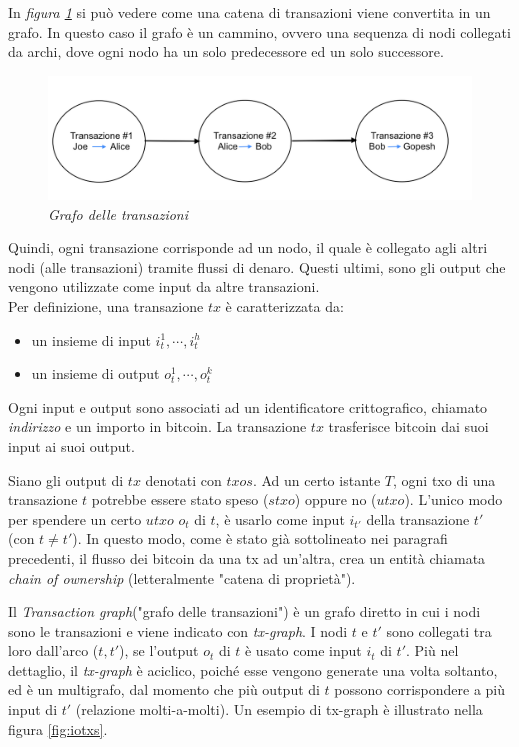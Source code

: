 In \textit{figura \ref{fig:threenodes}} si può vedere come una catena di transazioni viene convertita in un grafo. In questo caso il grafo è un cammino, ovvero una sequenza di nodi collegati da archi, dove ogni nodo ha un solo predecessore ed un solo successore.

\begin{figure}[htbp]
	\centering
	\includegraphics[width=\linewidth]{figure/threenodes}
	\caption{\textit{Grafo delle transazioni} \label{fig:threenodes}}
\end{figure}

Quindi, ogni transazione corrisponde ad un nodo, il quale è collegato agli altri nodi (alle transazioni) tramite flussi di denaro. Questi ultimi, sono gli output che vengono utilizzate come input da altre transazioni.
\\

Per definizione, una transazione $tx$ è caratterizzata da:
\begin{itemize}
	\item un insieme di input $i_t^1,\cdots,i_t^h$
	\item un insieme di output $o_t^1,\cdots,o_t^k$
\end{itemize}
Ogni input e output sono associati ad un identificatore crittografico, chiamato \textit{indirizzo} e un importo in bitcoin. La transazione $tx$ trasferisce bitcoin dai suoi input ai suoi output.

Siano gli output di $tx$ denotati con $txos$. Ad un certo istante $T$, ogni txo di una transazione $t$ potrebbe essere stato speso ($stxo$) oppure no ($utxo$). L'unico modo per spendere un certo $utxo$ $o_t$ di $t$, è usarlo come input $i_{t'}$ della transazione $t'$ (con $t \ne t'$). In questo modo, come è stato già sottolineato nei paragrafi precedenti, il flusso dei bitcoin da una tx ad un'altra, crea un entità chiamata \textit{chain of ownership} (letteralmente "catena di proprietà"). \cite{ddp-ltcbh-17}

Il \textit{Transaction graph}("grafo delle transazioni") è un grafo diretto in cui i nodi sono le transazioni e viene indicato con \textit{tx-graph}. I nodi $t$ e $t'$ sono collegati tra loro dall'arco ($t,t'$), se l'output $o_t$ di $t$ è usato come input $i_t$ di $t'$. Più nel dettaglio, il \textit{tx-graph} è aciclico, poiché esse vengono generate una volta soltanto, ed è un multigrafo, dal momento che più output di $t$ possono corrispondere a più input di $t'$ (relazione molti-a-molti).
Un esempio di tx-graph è illustrato nella figura \ref{fig:iotxs}.

